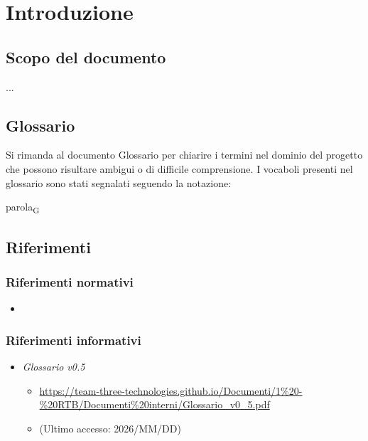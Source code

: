 \documentclass[a4paper,12pt]{article}
\begin{document}
    \section{Introduzione} {
        \subsection{Scopo del documento} {        
            ...
        }

        \subsection{Glossario} {
            Si rimanda al documento Glossario per chiarire i termini nel dominio del progetto che possono risultare ambigui o di difficile comprensione. I vocaboli presenti nel glossario sono stati segnalati seguendo la notazione:
            \begin{center}
                parola\textsubscript{G}
            \end{center}
        }
        
        \subsection{Riferimenti} {
            \subsubsection{Riferimenti normativi} {
                \begin{itemize}
                    \item
                \end{itemize}
            }
            \subsubsection{Riferimenti informativi} {
                \begin{itemize}
                    \item \textit{Glossario v0.5}
                    \begin{itemize}
                        \item \url{https://team-three-technologies.github.io/Documenti/1%20-%20RTB/Documenti%20interni/Glossario_v0_5.pdf}
                        \item[] (Ultimo accesso: 2026/MM/DD)
                    \end{itemize}
                \end{itemize}
            }
        }
    }
\end{document}
